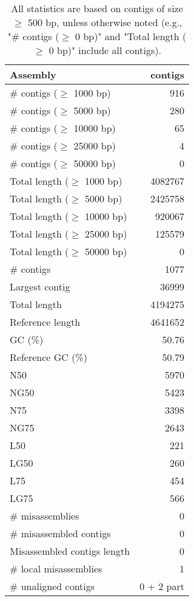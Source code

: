 \documentclass[12pt,a4paper]{article}
\begin{document}
\begin{table}[ht]
\begin{center}
\caption{All statistics are based on contigs of size $\geq$ 500 bp, unless otherwise noted (e.g., "\# contigs ($\geq$ 0 bp)" and "Total length ($\geq$ 0 bp)" include all contigs).}
\begin{tabular}{|l*{1}{|r}|}
\hline
Assembly & contigs \\ \hline
\# contigs ($\geq$ 1000 bp) & 916 \\ \hline
\# contigs ($\geq$ 5000 bp) & 280 \\ \hline
\# contigs ($\geq$ 10000 bp) & 65 \\ \hline
\# contigs ($\geq$ 25000 bp) & 4 \\ \hline
\# contigs ($\geq$ 50000 bp) & 0 \\ \hline
Total length ($\geq$ 1000 bp) & 4082767 \\ \hline
Total length ($\geq$ 5000 bp) & 2425758 \\ \hline
Total length ($\geq$ 10000 bp) & 920067 \\ \hline
Total length ($\geq$ 25000 bp) & 125579 \\ \hline
Total length ($\geq$ 50000 bp) & 0 \\ \hline
\# contigs & 1077 \\ \hline
Largest contig & 36999 \\ \hline
Total length & 4194275 \\ \hline
Reference length & 4641652 \\ \hline
GC (\%) & 50.76 \\ \hline
Reference GC (\%) & 50.79 \\ \hline
N50 & 5970 \\ \hline
NG50 & 5423 \\ \hline
N75 & 3398 \\ \hline
NG75 & 2643 \\ \hline
L50 & 221 \\ \hline
LG50 & 260 \\ \hline
L75 & 454 \\ \hline
LG75 & 566 \\ \hline
\# misassemblies & 0 \\ \hline
\# misassembled contigs & 0 \\ \hline
Misassembled contigs length & 0 \\ \hline
\# local misassemblies & 1 \\ \hline
\# unaligned contigs & 0 + 2 part \\ \hline

\end{tabular}
\end{center}
\end{table}
\end{document}

